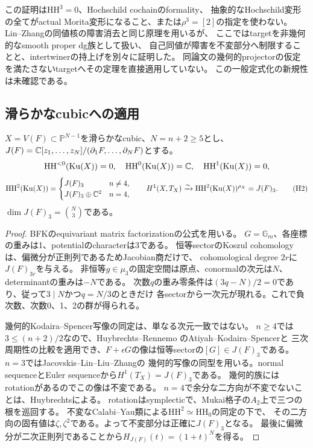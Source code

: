 \begin{remark}[使わない仮定と先行研究]\label{er:rem:etale-scope}
この証明は$\mathrm{HH}^3=0$、Hochschild cochainのformality、
抽象的なHochschild変形の全てがactual Morita変形になること、または$\rho^3=[2]$の指定を使わない。
Lin--Zhang\cite[Theorem 2.2, Proposition 2.4]{ERLinZhang}の同値核の障害消去と同じ原理を用いるが、
ここではtargetを非幾何的なsmooth proper dg族として扱い、
自己同値が障害を不変部分へ制限することと、intertwinerの持上げを別々に証明した。
同論文の幾何的projectorの仮定を満たさないtargetへその定理を直接適用していない。
この一般定式化の新規性は未確認である。
\end{remark}

\subsection{滑らかなcubicへの適用}
\begin{lemma}[低次Hochschild群と幾何的接写像]\label{er:lem:cubic}
$X=V(F)\subset\mathbb P^{N-1}$を滑らかなcubic、$N=n+2\ge5$とし、
$J(F)=\mathbb C[z_1,\ldots,z_N]/(\partial_1F,\ldots,\partial_NF)$とする。
\[
 \mathrm{HH}^{<0}(\operatorname{Ku}(X))=0,\quad
 \mathrm{HH}^0(\operatorname{Ku}(X))=\mathbb C,\quad \mathrm{HH}^1(\operatorname{Ku}(X))=0,
\]
\[
 \mathrm{HH}^2(\operatorname{Ku}(X))=
 \begin{cases}J(F)_3&n\ne4,\\J(F)_3\oplus\mathbb C^2&n=4,\end{cases}
 \qquad
 H^1(X,T_X)\xrightarrow{\sim}\mathrm{HH}^2(\operatorname{Ku}(X))^{\rho_X}=J(F)_3.
 \tag{H2}\label{er:eq:HH}
\]
$\dim J(F)_3=\binom N3$である。
\end{lemma}
\begin{proof}
BFK\cite[Theorem 5.39]{BFKER}のequivariant matrix factorizationの公式を用いる。
$G=\mathbb G_m$、各座標の重みは1、potentialのcharacterは3である。
恒等sectorのKoszul cohomologyは、偏微分が正則列であるためJacobian商だけで、
cohomological degree $2r$に$J(F)_{3r}$を与える。
非恒等$g\in\mu_3$の固定空間は原点、conormalの次元は$N$、determinantの重みは$-N$である。
次数$q$の重み零条件は$(3q-N)/2=0$であり、従って$3\mid N$かつ$q=N/3$のときだけ
各sectorから一次元が現れる。これで負次数、次数0、1、2の群が得られる。

幾何的Kodaira--Spencer写像の同定は、単なる次元一致ではない。
$n\ge4$では$3\le(n+2)/2$なので、Huybrechts--Rennemo
\cite[Lemma 2.19, \S2.5, \S3.3]{HRER}のAtiyah--Kodaira--Spencerと
三次周期性の比較を適用でき、$F+\epsilon G$の像は恒等sectorの$[G]\in J(F)_3$である。
$n=3$ではJacovskis--Lin--Liu--Zhang\cite[Theorem 4.4(2)]{JLLZER}の
幾何的写像の同型を用いる。normal sequenceとEuler sequenceから$H^1(T_X)=J(F)_3$である。
幾何的族にはrotationがあるのでこの像は不変である。
$n=4$で余分な二方向が不変でないことは、Huybrechts\cite[Proposition 3.12]{HuyER}による。
rotationはsymplecticで、Mukai格子の$A_2$上で三つの根を巡回する。
不変なCalabi--Yau類による$\mathrm{HH}^2\simeq\mathrm{HH}_0$の同定の下で、
その二方向の固有値は$\zeta,\zeta^2$である。よって不変部分は正確に$J(F)_3$となる。
最後に偏微分が二次正則列であることから$H_{J(F)}(t)=(1+t)^N$を得る。
\end{proof}

